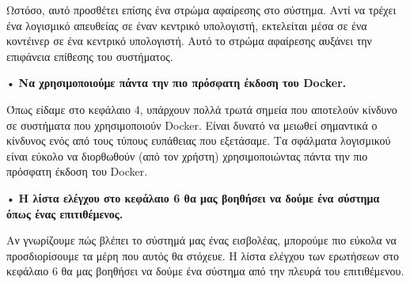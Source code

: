 Ωστόσο, αυτό προσθέτει επίσης ένα στρώμα αφαίρεσης στο σύστημα. Αντί να τρέχει
ένα λογισμικό απευθείας σε έναν κεντρικό υπολογιστή, εκτελείται μέσα σε ένα
κοντέινερ σε ένα κεντρικό υπολογιστή. Αυτό το στρώμα αφαίρεσης αυξάνει την
επιφάνεια επίθεσης του συστήματος.

• \textbf{Να χρησιμοποιούμε πάντα την πιο πρόσφατη έκδοση του
\textlatin{Docker.}}

Όπως είδαμε στο κεφάλαιο 4, υπάρχουν πολλά τρωτά σημεία που αποτελούν κίνδυνο
σε συστήματα που χρησιμοποιούν \textlatin{Docker}. Είναι δυνατό να μειωθεί
σημαντικά ο κίνδυνος ενός από τους τύπους ευπάθειας που εξετάσαμε. Τα σφάλματα
λογισμικού είναι εύκολο να διορθωθούν (από τον χρήστη) χρησιμοποιώντας πάντα την
πιο πρόσφατη έκδοση του \textlatin{Docker}.

• \textbf{Η λίστα ελέγχου στο κεφάλαιο 6 θα μας βοηθήσει να δούμε ένα σύστημα
όπως ένας επιτιθέμενος.}

Αν γνωρίζουμε πώς βλέπει το σύστημά μας ένας εισβολέας, μπορούμε πιο εύκολα να
προσδιορίσουμε τα μέρη που αυτός θα στόχευε. Η λίστα ελέγχου των ερωτήσεων στο
κεφάλαιο 6 θα μας βοηθήσει να δούμε ένα σύστημα από την πλευρά του επιτιθέμενου.

